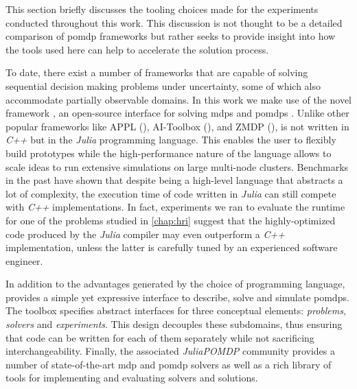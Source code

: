 This section briefly discusses the tooling choices made for the experiments
conducted throughout this work. This discussion is not thought to be a detailed
comparison of \ac{pomdp} frameworks but rather seeks to provide insight into
how the tools used here can help to accelerate the solution process.

To date, there exist a number of frameworks that are capable of solving
sequential decision making problems under uncertainty, some of which also
accommodate partially observable domains. In this work we make use of the novel
framework \pomdpsjl, an open-source interface for solving \acp{mdp} and
\acp{pomdp} \cite{egorov2017pomdps}. Unlike other popular frameworks like APPL
(\cite{appl}), AI-Toolbox (\cite{aitoolbox}), and ZMDP (\cite{zmdp}), \pomdpsjl
is not written in \emph{C++} but in the \emph{Julia} programming language. This
enables the user to flexibly build prototypes while the high-performance nature
of the language allows to scale ideas to run extensive simulations on large
multi-node clusters. Benchmarks in the past have shown that despite being
a high-level language that abstracts a lot of complexity, the execution time of
code written in \emph{Julia} can still compete with \emph{C++} implementations.
In fact, experiments we ran to evaluate the runtime for one of the problems
studied in \cref{chap:hri} suggest that the highly-optimized code produced by
the \emph{Julia} compiler may even outperform a \emph{C++} implementation,
unless the latter is carefully tuned by an experienced software engineer.

In addition to the advantages generated by the choice of programming language,
\pomdpsjl provides a simple yet expressive interface to describe, solve and
simulate \acp{pomdp}. The toolbox specifies abstract interfaces for three
conceptual elements: \emph{problems}, \emph{solvers} and \emph{experiments}.
This design decouples these subdomains, thus ensuring that code can be written
for each of them separately while not sacrificing interchangeability. Finally,
the associated \emph{JuliaPOMDP} community provides a number of
state-of-the-art \ac{mdp} and \ac{pomdp} solvers as well as a rich library of
tools for implementing and evaluating solvers and solutions.
